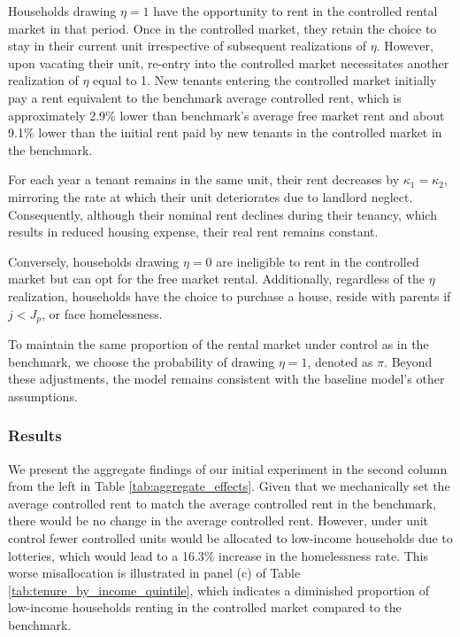 \documentclass[parskip=full]{article}
\begin{document}
Households drawing $\eta = 1$ have the opportunity to rent in the controlled rental market in that period. Once in the controlled market, they retain the choice to stay in their current unit irrespective of subsequent realizations of $\eta$. However, upon vacating their unit, re-entry into the controlled market necessitates another realization of $\eta$ equal to 1. New tenants entering the controlled market initially pay a rent equivalent to the benchmark average controlled rent, which is approximately 2.9\% lower than benchmark's average free market rent and about 9.1\% lower than the initial rent paid by new tenants in the controlled market in the benchmark.

For each year a tenant remains in the same unit, their rent decreases by $\kappa_{1}=\kappa_{2}$, mirroring the rate at which their unit deteriorates due to landlord neglect. Consequently, although their nominal rent declines during their tenancy, which results in reduced housing expense, their real rent remains constant.

Conversely, households drawing $\eta = 0$ are ineligible to rent in the controlled market but can opt for the free market rental. Additionally, regardless of the $\eta$ realization, households have the choice to purchase a house, reside with parents if $j<J_{p}$, or face homelessness.

To maintain the same proportion of the rental market under control as in the benchmark, we choose the probability of drawing $\eta = 1$, denoted as $\pi$. Beyond these adjustments, the model remains consistent with the baseline model's other assumptions.

\subsubsection{Results}

We present the aggregate findings of our initial experiment in the second column from the left in Table \ref{tab:aggregate_effects}. Given that we mechanically set the average controlled rent to match the average controlled rent in the benchmark, there would be no change in the average controlled rent. However, under unit control fewer controlled units would be allocated to low-income households due to lotteries, which would lead to a 16.3\% increase in the homelessness rate. This worse misallocation is illustrated in panel (c) of Table \ref{tab:tenure_by_income_quintile}, which indicates a diminished proportion of low-income households renting in the controlled market compared to the benchmark.
\end{document}

